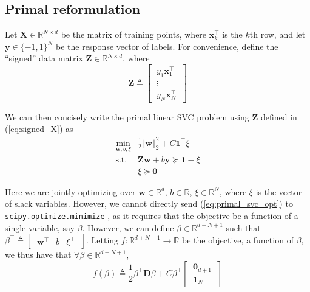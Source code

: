 \documentclass{article}
\numberwithin{equation}{section}
\newcommand{\minimize}{%
    \href{%
        https://docs.scipy.org/doc/scipy/reference/generated/%
        scipy.optimize.minimize.html%
    }{\texttt{scipy.optimize.minimize}}%
}
\begin{document}
\subsection{Primal reformulation}

Let $ \mathbf{X} \in \mathbb{R}^{N \times d} $ be the matrix of training
points, where $ \mathbf{x}_k^\top $ is the $ k $th row, and let
$ \mathbf{y} \in \{-1, 1\}^N $ be the response vector of labels. For
convenience, define the ``signed'' data matrix
$ \mathbf{Z} \in \mathbb{R}^{N \times d} $, where
\begin{equation} \label{eq:signed_X}
    \mathbf{Z} \triangleq \begin{bmatrix}
        \ y_1\mathbf{x}_1^\top \ \\ \ \vdots \ \\ \ y_N\mathbf{x}_N^\top \
    \end{bmatrix}
\end{equation}

We can then concisely write the primal linear SVC problem using
$ \mathbf{Z} $ defined in (\ref{eq:signed_X}) as
\begin{equation} \label{eq:primal_svc_opt}
    \begin{array}{ll}
        \displaystyle\min_{\mathbf{w}, b, \xi} &
            \frac{1}{2}\Vert\mathbf{w}\Vert_2^2 +
            C\mathbf{1}^\top\xi \\
        \text{s.t.} & \mathbf{Zw} + b\mathbf{y} \succeq
            \mathbf{1} - \xi  \\
            & \xi \succeq \mathbf{0}
    \end{array}
\end{equation}

Here we are jointly optimizing over $ \mathbf{w} \in \mathbb{R}^d $,
$ b \in \mathbb{R} $, $ \xi \in \mathbb{R}^N $, where $ \xi $ is the vector
of slack variables. However, we cannot directly send (\ref{eq:primal_svc_opt})
to \minimize, as it requires that the objective be a function of a single
variable, say $ \beta $. However, we can define $ \beta \in
\mathbb{R}^{d + N + 1} $ such that $ \beta^\top \triangleq
\begin{bmatrix} \ \mathbf{w}^\top & b & \xi^\top \ \end{bmatrix} $. Letting
$ f : \mathbb{R}^{d + N + 1} \rightarrow \mathbb{R} $ be the objective, a
function of $ \beta $, we thus have that $ \forall \beta \in
\mathbb{R}^{d + N + 1} $,
\begin{equation} \label{eq:primal_obj_joint}
    f(\beta) \triangleq \frac{1}{2}\beta^\top\mathbf{D}\beta +
    C\beta^\top\begin{bmatrix}
        \ \mathbf{0}_{d + 1} \ \\ \ \mathbf{1}_N \
    \end{bmatrix}
\end{equation}
\end{document}
